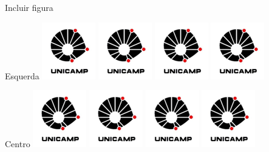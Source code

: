 \documentclass[letterpaper,11pt]{article}
\begin{document}
Incluir figura
\begin{flushleft}
 Esquerda
 \includegraphics[scale=0.25]{logo.png}
 \includegraphics[scale=0.5]{logo.png}
 \includegraphics[scale=1.0]{logo.png}
 \includegraphics[scale=2.0]{logo.png}
\end{flushleft}
\begin{center}
 Centro
 \includegraphics[scale=0.25]{logo.png}
 \includegraphics[scale=0.5]{logo.png}
 \includegraphics[scale=1.0]{logo.png}
 \includegraphics[scale=2.0]{logo.png}
\end{center}
\end{document}

